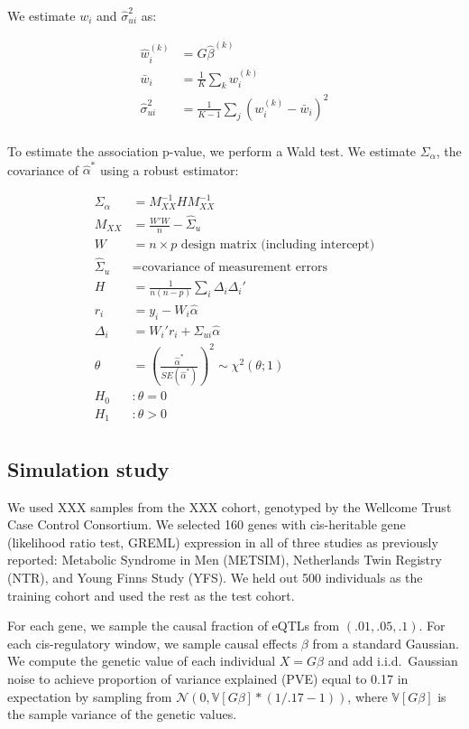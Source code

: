 \documentclass{article}
\begin{document}
We estimate $w_i$ and $\hat\sigma_{ui}^2$ as:

\begin{align*}
  \hat w_i^{(k)} &= G \hat{\beta}^{(k)}\\
  \bar w_i &= \frac{1}{K} \sum_{k}{w_i^{(k)}}\\
  \hat\sigma_{ui}^2 &= \frac{1}{K - 1} \sum_j (w_i^{(k)} - \bar w_i)^2\\
\end{align*}

To estimate the association p-value, we perform a Wald test. We estimate
$\Sigma_\alpha$, the covariance of $\hat\alpha^*$ using a robust
estimator\cite{fuller1987}:

\begin{align*}
  \Sigma_\alpha &= M_{XX}^{-1} H M_{XX}^{-1}\\
  M_{XX} &= \frac{W' W}{n} - \hat\Sigma_u\\
  W &= \text{$n \times p$ design matrix (including intercept)}\\
  \hat\Sigma_u &= \text{covariance of measurement errors}\\
  H &= \frac{1}{n(n - p)} \sum_i \Delta_i \Delta_i'\\
  r_i &= y_i - W_i \hat\alpha\\
  \Delta_i &= W_i' r_i + \Sigma_{ui} \hat\alpha\\
  \theta &= \left(\frac{\hat\alpha^*}{SE(\hat\alpha^*)}\right)^2 \sim \chi^2(\theta; 1)\\
  H_0&: \theta = 0\\
  H_1&: \theta > 0\\
\end{align*}

\subsection{Simulation study}

We used XXX samples from the XXX cohort, genotyped by the Wellcome Trust Case
Control Consortium. We selected 160 genes with cis-heritable gene (likelihood
ratio test, GREML) expression in all of three studies as previously
reported\cite{10.1038/ng.3506}: Metabolic Syndrome in Men (METSIM), Netherlands
Twin Registry (NTR), and Young Finns Study (YFS). We held out 500 individuals
as the training cohort and used the rest as the test cohort.

For each gene, we sample the causal fraction of eQTLs from $(.01, .05, .1)$.
For each cis-regulatory window, we sample causal effects $\beta$ from a
standard Gaussian. We compute the genetic value of each individual $X = G
\beta$ and add i.i.d.\ Gaussian noise to achieve proportion of variance
explained (PVE) equal to 0.17 in expectation by sampling from $\mathcal{N}(0,
\mathbb{V}[G \beta] * (1 / .17 - 1))$, where $\mathbb{V}[G \beta]$ is the
sample variance of the genetic values.
\end{document}
